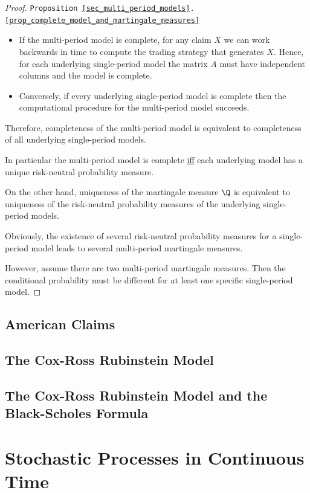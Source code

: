 \documentclass[11pt,a4paper]{article}
\begin{document}
  \begin{proof}{\texttt{Proposition \ref{sec_multi_period_models}.\ref{prop_complete_model_and_martingale_measures}}}
    \begin{itemize}
      \item If the multi-period model is complete, for any claim $X$ we can work backwards in time to compute the trading strategy that generates $X$. Hence, for each underlying single-period model the matrix $A$ must have independent columns and the model is complete.
      \item Conversely, if every underlying single-period model is complete then the computational procedure for the multi-period model succeeds.
    \end{itemize}
    Therefore, completeness of the multi-period model is equivalent to completeness of all underlying single-period models.
    \par In particular the multi-period model is complete \underline{iff} each underlying model has a unique risk-neutral probability measure.
    \par On the other hand, uniqueness of the martingale measure $\Q$ is equivalent to uniqueness of the risk-neutral probability measures of the underlying single-period models.
    \par Obviously, the existence of several risk-neutral probability measures for a single-period model leads to several multi-period martingale measures.
    \par However, assume there are two multi-period martingale measures. Then the conditional probability must be different for at least one specific single-period model.\proved
  \end{proof}

\subsection{American Claims}

\subsection{The Cox-Ross Rubinstein Model}

\subsection{The Cox-Ross Rubinstein Model and the Black-Scholes Formula}

\section{Stochastic Processes in Continuous Time} \label{sec_stochastic_processes_in_continuous_time}
\end{document}
